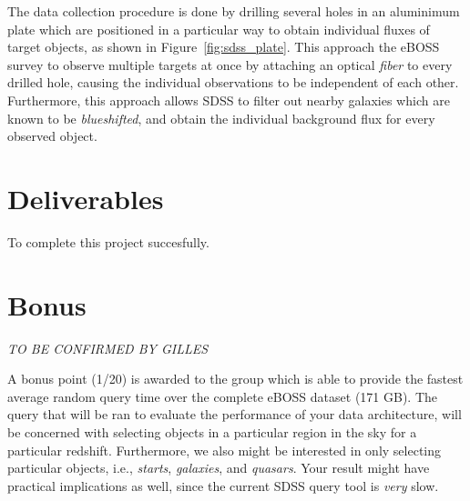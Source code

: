 The data collection procedure is done by drilling several holes in an aluminimum plate which are positioned in a particular way to obtain individual fluxes of target objects, as shown in Figure~\ref{fig:sdss_plate}. This approach the eBOSS survey to observe multiple targets at once by attaching an optical \emph{fiber} to every drilled hole, causing the individual observations to be independent of each other. Furthermore, this approach allows SDSS to filter out nearby galaxies which are known to be \emph{blueshifted}, and obtain the individual background flux for every observed object.

\section{Deliverables}
\label{sec:deliverables}

To complete this project succesfully.

\section{Bonus}
\label{sec:bonus}

\emph{TO BE CONFIRMED BY GILLES}

A bonus point (1/20) is awarded to the group which is able to provide the fastest average random query time over the complete eBOSS dataset (171 GB). The query that will be ran to evaluate the performance of your data architecture, will be concerned with selecting objects in a particular region in the sky for a particular redshift. Furthermore, we also might be interested in only selecting particular objects, i.e., \emph{starts}, \emph{galaxies}, and \emph{quasars}. Your result might have practical implications as well, since the current SDSS query tool is \emph{very} slow.


